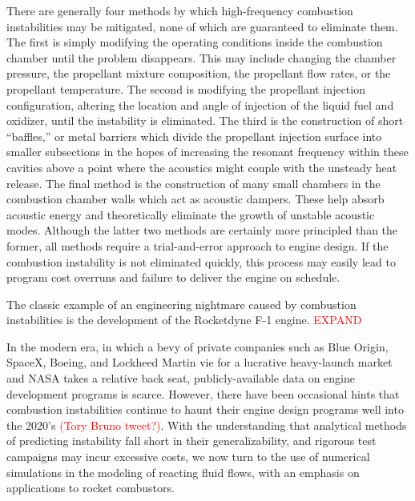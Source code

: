 There are generally four methods by which high-frequency combustion instabilities may be mitigated, none of which are guaranteed to eliminate them. The first is simply modifying the operating conditions inside the combustion chamber until the problem disappears. This may include changing the chamber pressure, the propellant mixture composition, the propellant flow rates, or the propellant temperature. The second is modifying the propellant injection configuration, altering the location and angle of injection of the liquid fuel and oxidizer, until the instability is eliminated. The third is the construction of short ``baffles,'' or metal barriers which divide the propellant injection surface into smaller subsections in the hopes of increasing the resonant frequency within these cavities above a point where the acoustics might couple with the unsteady heat release. The final method is the construction of many small chambers in the combustion chamber walls which act as acoustic dampers. These help absorb acoustic energy and theoretically eliminate the growth of unstable acoustic modes. Although the latter two methods are certainly more principled than the former, all methods require a trial-and-error approach to engine design. If the combustion instability is not eliminated quickly, this process may easily lead to program cost overruns and failure to deliver the engine on schedule. 

The classic example of an engineering nightmare caused by combustion instabilities is the development of the Rocketdyne F-1 engine. \textcolor{red}{EXPAND}

In the modern era, in which a bevy of private companies such as Blue Origin, SpaceX, Boeing, and Lockheed Martin vie for a lucrative heavy-launch market and NASA takes a relative back seat, publicly-available data on engine development programs is scarce. However, there have been occasional hints that combustion instabilities continue to haunt their engine design programs well into the 2020's \textcolor{red}{(Tory Bruno tweet?)}. With the understanding that analytical methods of predicting instability fall short in their generalizability, and rigorous test campaigns may incur excessive costs, we now turn to the use of numerical simulations in the modeling of reacting fluid flows, with an emphasis on applications to rocket combustors.

